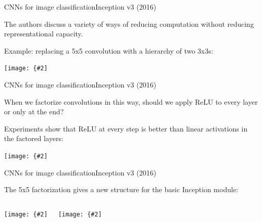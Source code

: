 \documentclass{beamer}
\newcommand{\myfig}[3]{\centerline{\texttt{[image: \{\#2]}}}
\begin{document}
\begin{frame}{CNNs for image classification}{Inception v3 (2016)}

  The authors discuss a variety of ways of reducing computation
  without reducing representational capacity.

  \medskip

  Example: replacing a 5x5 convolution with a hierarchy of two
  3x3s:

  \medskip

  \myfig{2in}{szegedy-15-fig1}{Szegedy et al. (2016), Figure 1}

\end{frame}


\begin{frame}{CNNs for image classification}{Inception v3 (2016)}

  When we factorize convolutions in this way, should we apply
  ReLU to every layer or only at the end?

  \medskip

  Experiments show that ReLU at every step is better than linear
  activations in the factored layers:

  \medskip

  \myfig{3in}{szegedy-15-fig2}{Szegedy et al. (2016), Figure 2}

\end{frame}


\begin{frame}{CNNs for image classification}{Inception v3 (2016)}

  The 5x5 factorization gives a new structure for the basic
  Inception module:

  \begin{columns}

  \column{2in}

  \myfig{1.5in}{szegedy-15-fig4}{Szegedy et al. (2016), Figure 4}

  \column{2in}

  \myfig{1.5in}{szegedy-15-fig5}{Szegedy et al. (2016), Figure 5}

  \end{columns}

\end{frame}
\end{document}
